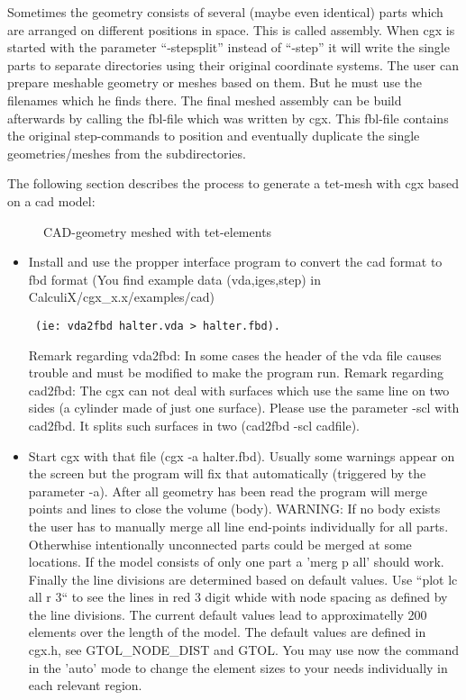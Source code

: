 \documentclass{article}
\begin{document}
\begin{appendix}
\begin{itemize}
Sometimes the geometry consists of several (maybe even identical) parts which are arranged on different positions in space. This is called assembly. When cgx is started with the parameter ``-stepsplit'' instead of ``-step'' it will write the single parts to separate directories using their original coordinate systems. The user can prepare meshable geometry or meshes based on them. But he must use the filenames which he finds there. The final meshed assembly can be build afterwards by calling the fbl-file which was written by cgx. This fbl-file contains the original step-commands to position and eventually duplicate the single geometries/meshes from the subdirectories.   
\end{itemize}

The following section describes the process to generate a tet-mesh with cgx based on a cad model:


\begin{figure}[h]
\caption{\label{halter} CAD-geometry meshed with tet-elements }
\end{figure}

\begin{itemize}

\item Install and use the propper interface program to convert the cad format to fbd format (You find example data (vda,iges,step) in CalculiX/cgx\_x.x/examples/cad)\begin{verbatim} (ie: vda2fbd halter.vda > halter.fbd). \end{verbatim} Remark regarding vda2fbd: In some cases the header of the vda file causes trouble and must be modified to make the program run. Remark regarding cad2fbd: The cgx can not deal with surfaces which use the same line on two sides (a cylinder made of just one surface). Please use the parameter -scl with cad2fbd. It splits such surfaces in two (cad2fbd -scl cadfile).

\item Start cgx with that file (cgx -a halter.fbd). Usually some warnings appear on the screen but the program will fix that automatically (triggered by the parameter -a). After all geometry has been read the program will merge points and lines to close the volume (body). WARNING: If no body exists the user has to manually merge all line end-points individually for all parts. Otherwhise intentionally unconnected parts could be merged at some locations. If the model consists of only one part a 'merg p all' should work. Finally the line divisions are determined based on default values. Use ``plot lc all r 3`` to see the lines in red 3 digit whide with node spacing as defined by the line divisions. The current default values lead to approximatelly 200 elements over the length of the model. The default values are defined in cgx.h, see GTOL\_NODE\_DIST and GTOL. You may use now the command  in the 'auto' mode to change the element sizes to your needs individually in each relevant region.


\end{itemize}
\end{appendix}
\end{document}
